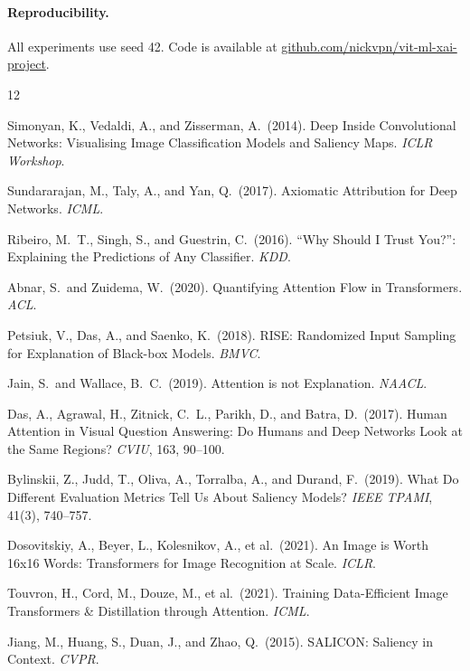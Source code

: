 \documentclass{article}
\begin{document}
\paragraph{Reproducibility.}
All experiments use seed 42. Code is available at \href{https://github.com/nickvpn/vit-ml-xai-project}{github.com/nickvpn/vit-ml-xai-project}.

\begin{thebibliography}{12}

Simonyan, K., Vedaldi, A., and Zisserman, A.\ (2014).
Deep Inside Convolutional Networks: Visualising Image Classification Models and Saliency Maps.
\textit{ICLR Workshop}.

Sundararajan, M., Taly, A., and Yan, Q.\ (2017).
Axiomatic Attribution for Deep Networks.
\textit{ICML}.

Ribeiro, M.~T., Singh, S., and Guestrin, C.\ (2016).
``Why Should I Trust You?'': Explaining the Predictions of Any Classifier.
\textit{KDD}.

Abnar, S.\ and Zuidema, W.\ (2020).
Quantifying Attention Flow in Transformers.
\textit{ACL}.

Petsiuk, V., Das, A., and Saenko, K.\ (2018).
RISE: Randomized Input Sampling for Explanation of Black-box Models.
\textit{BMVC}.

Jain, S.\ and Wallace, B.~C.\ (2019).
Attention is not Explanation.
\textit{NAACL}.

Das, A., Agrawal, H., Zitnick, C.~L., Parikh, D., and Batra, D.\ (2017).
Human Attention in Visual Question Answering: Do Humans and Deep Networks Look at the Same Regions?
\textit{CVIU}, 163, 90--100.

Bylinskii, Z., Judd, T., Oliva, A., Torralba, A., and Durand, F.\ (2019).
What Do Different Evaluation Metrics Tell Us About Saliency Models?
\textit{IEEE TPAMI}, 41(3), 740--757.

Dosovitskiy, A., Beyer, L., Kolesnikov, A., et al.\ (2021).
An Image is Worth 16x16 Words: Transformers for Image Recognition at Scale.
\textit{ICLR}.

Touvron, H., Cord, M., Douze, M., et al.\ (2021).
Training Data-Efficient Image Transformers \& Distillation through Attention.
\textit{ICML}.

Jiang, M., Huang, S., Duan, J., and Zhao, Q.\ (2015).
SALICON: Saliency in Context.
\textit{CVPR}.

\end{thebibliography}
\end{document}
